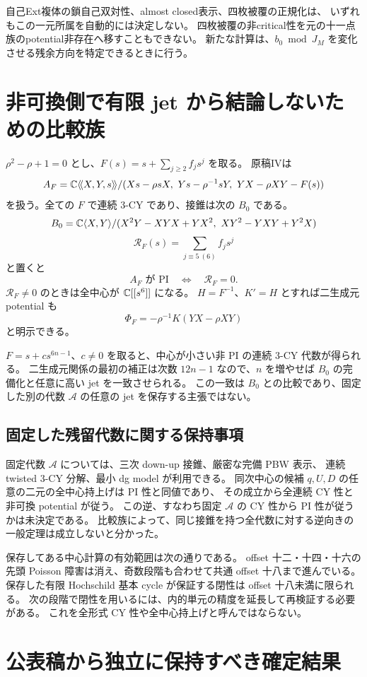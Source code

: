 自己Ext複体の鎖自己双対性、almost closed表示、四枚被覆の正規化は、
いずれもこの一元所属を自動的には決定しない。
四枚被覆の非critical性を元の十一点族のpotential非存在へ移すこともできない。
新たな計算は、$b_0\bmod J_M$ を変化させる残余方向を特定できるときに行う。

\section{非可換側で有限 jet から結論しないための比較族}

$\rho^2-\rho+1=0$ とし、$F(s)=s+\sum_{j\ge2}f_js^j$ を取る。
原稿IVは
\[
 A_F=\mathbb C\langle\!\langle X,Y,s\rangle\!\rangle/
 (Xs-\rho sX,\ Ys-\rho^{-1}sY,\ YX-\rho XY-F(s))
\]
を扱う。全ての $F$ で連続 $3$-CY であり、接錐は次の $B_0$ である。
\[
 B_0=\mathbb C\langle X,Y\rangle/
 (X^2Y-XYX+YX^2,\ XY^2-YXY+Y^2X)
\]
\[
 \mathcal R_F(s)=\sum_{j\equiv5\ (6)}f_js^j
\]
と置くと
\[
 A_F\text{ が PI}\quad\Longleftrightarrow\quad\mathcal R_F=0.
\]
$\mathcal R_F\ne0$ のときは全中心が $\mathbb C[[s^6]]$ になる。
$H=F^{-1}$、$K'=H$ とすれば二生成元 potential も
\[
 \Phi_F=-\rho^{-1}K(YX-\rho XY)
\]
と明示できる。

$F=s+c s^{6n-1}$、$c\ne0$ を取ると、中心が小さい非 PI の連続 $3$-CY 代数が得られる。
二生成元関係の最初の補正は次数 $12n-1$ なので、$n$ を増やせば
$B_0$ の完備化と任意に高い jet を一致させられる。
この一致は $B_0$ との比較であり、固定した別の代数 $\mathcal A$ の任意の jet を保存する主張ではない。

\subsection{固定した残留代数に関する保持事項}
固定代数 $\mathcal A$ については、三次 down-up 接錐、厳密な完備 PBW 表示、
連続 twisted $3$-CY 分解、最小 dg model が利用できる。
同次中心の候補 $q,U,D$ の任意の二元の全中心持上げは PI 性と同値であり、
その成立から全連続 CY 性と非可換 potential が従う。
この逆、すなわち固定 $\mathcal A$ の CY 性から PI 性が従うかは未決定である。
比較族によって、同じ接錐を持つ全代数に対する逆向きの一般定理は成立しないと分かった。

保存してある中心計算の有効範囲は次の通りである。
offset 十二・十四・十六の先頭 Poisson 障害は消え、奇数段階も合わせて共通 offset 十八まで進んでいる。
保存した有限 Hochschild 基本 cycle が保証する閉性は offset 十八未満に限られる。
次の段階で閉性を用いるには、内的単元の精度を延長して再検証する必要がある。
これを全形式 CY 性や全中心持上げと呼んではならない。

\section{公表稿から独立に保持すべき確定結果}

